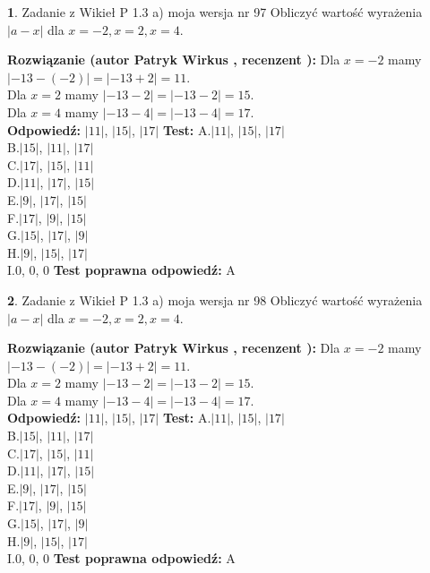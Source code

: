 \documentclass[12pt, a4paper]{article}
\theoremstyle{definition} %
\newtheorem{zad}{}
\newcommand{\zadStart}[1]{\begin{zad}#1\newline}
\newcommand{\zadStop}{\end{zad}}
\newcommand{\rozwStart}[2]{\noindent \textbf{Rozwiązanie (autor #1 , recenzent #2): }\newline}
\newcommand{\rozwStop}{\newline}
\newcommand{\odpStart}{\noindent \textbf{Odpowiedź:}\newline}
\newcommand{\odpStop}{\newline}
\newcommand{\testStart}{\noindent \textbf{Test:}\newline}
\newcommand{\testStop}{\newline}
\newcommand{\kluczStart}{\noindent \textbf{Test poprawna odpowiedź:}\newline}
\newcommand{\kluczStop}{\newline}
\begin{document}
\zadStart{Zadanie z Wikieł P 1.3 a) moja wersja nr 97}
Obliczyć wartość wyrażenia $|a - x|$ dla $x=-2,x=2,x=4$.
\zadStop
\rozwStart{Patryk Wirkus}{}
Dla $x = -2$ mamy $|-13 - (-2)| = |-13 + 2| = 11$.\\
Dla $x = 2$ mamy $|-13 - 2| = |-13 - 2| = 15$.\\
Dla $x = 4$ mamy $|-13 - 4| = |-13 - 4| = 17$.\\
\rozwStop
\odpStart
$|11|$, $|15|$, $|17|$
\odpStop
\testStart
A.$|11|$, $|15|$, $|17|$\\
B.$|15|$, $|11|$, $|17|$\\
C.$|17|$, $|15|$, $|11|$\\
D.$|11|$, $|17|$, $|15|$\\
E.$|9|$, $|17|$, $|15|$\\
F.$|17|$, $|9|$, $|15|$\\
G.$|15|$, $|17|$, $|9|$\\
H.$|9|$, $|15|$, $|17|$\\
I.$0$, $0$, $0$
\testStop
\kluczStart
A
\kluczStop



\zadStart{Zadanie z Wikieł P 1.3 a) moja wersja nr 98}
Obliczyć wartość wyrażenia $|a - x|$ dla $x=-2,x=2,x=4$.
\zadStop
\rozwStart{Patryk Wirkus}{}
Dla $x = -2$ mamy $|-13 - (-2)| = |-13 + 2| = 11$.\\
Dla $x = 2$ mamy $|-13 - 2| = |-13 - 2| = 15$.\\
Dla $x = 4$ mamy $|-13 - 4| = |-13 - 4| = 17$.\\
\rozwStop
\odpStart
$|11|$, $|15|$, $|17|$
\odpStop
\testStart
A.$|11|$, $|15|$, $|17|$\\
B.$|15|$, $|11|$, $|17|$\\
C.$|17|$, $|15|$, $|11|$\\
D.$|11|$, $|17|$, $|15|$\\
E.$|9|$, $|17|$, $|15|$\\
F.$|17|$, $|9|$, $|15|$\\
G.$|15|$, $|17|$, $|9|$\\
H.$|9|$, $|15|$, $|17|$\\
I.$0$, $0$, $0$
\testStop
\kluczStart
A
\kluczStop
\end{document}
